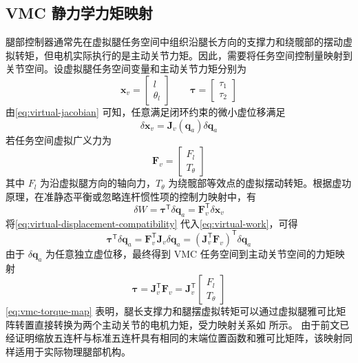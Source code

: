 \subsection{VMC 静力学力矩映射}

腿部控制器通常先在虚拟腿任务空间中组织沿腿长方向的支撑力和绕髋部的摆动虚拟转矩，但电机实际执行的是主动关节力矩。因此，需要将任务空间控制量映射到关节空间。设虚拟腿任务空间变量和主动关节力矩分别为
\begin{equation}
  \boldsymbol{x}_v =
  \begin{bmatrix}
    l \\
    \theta_l
  \end{bmatrix}
  \qquad
  \boldsymbol{\tau} =
  \begin{bmatrix}
    \tau_1 \\
    \tau_2
  \end{bmatrix}
  \label{eq:joint-torque-and-state}
\end{equation}
由\eqref{eq:virtual-jacobian} 可知，任意满足闭环约束的微小虚位移满足
\begin{equation}
  \delta\boldsymbol{x}_v
  =
  \boldsymbol{J}_v(\boldsymbol{q}_a)\delta\boldsymbol{q}_a
  \label{eq:virtual-displacement-compatibility}
\end{equation}
若任务空间虚拟广义力为
\begin{equation}
  \boldsymbol{F}_v =
  \begin{bmatrix}
    F_l \\
    T_\theta
  \end{bmatrix}
  \label{eq:virtual-force-vector}
\end{equation}
其中 $F_l$ 为沿虚拟腿方向的轴向力，$T_\theta$ 为绕髋部等效点的虚拟摆动转矩。根据虚功原理，在准静态平衡或忽略连杆惯性项的控制力映射中，有
\begin{equation}
  \delta W
  =
  \boldsymbol{\tau}^\mathsf{T}\delta\boldsymbol{q}_a
  =
  \boldsymbol{F}_v^\mathsf{T}\delta\boldsymbol{x}_v
  \label{eq:virtual-work}
\end{equation}
将\eqref{eq:virtual-displacement-compatibility} 代入\eqref{eq:virtual-work}，可得
\begin{equation}
  \boldsymbol{\tau}^\mathsf{T}\delta\boldsymbol{q}_a
  =
  \boldsymbol{F}_v^\mathsf{T}\boldsymbol{J}_v\delta\boldsymbol{q}_a
  =
  \left(
    \boldsymbol{J}_v^\mathsf{T}\boldsymbol{F}_v
  \right)^\mathsf{T}
  \delta\boldsymbol{q}_a
  \label{eq:virtual-work-substitution}
\end{equation}
由于 $\delta\boldsymbol{q}_a$ 为任意独立虚位移，最终得到 VMC 任务空间到主动关节空间的力矩映射
\begin{equation}
  \boldsymbol{\tau}
  =
  \boldsymbol{J}_v^\mathsf{T}\boldsymbol{F}_v
  =
  \boldsymbol{J}_v^\mathsf{T}
  \begin{bmatrix}
    F_l \\
    T_\theta
  \end{bmatrix}
  \label{eq:vmc-torque-map}
\end{equation}
\eqref{eq:vmc-torque-map} 表明，腿长支撑力和腿摆虚拟转矩可以通过虚拟腿雅可比矩阵转置直接转换为两个主动关节的电机力矩，受力映射关系如 所示。
由于前文已经证明缩放五连杆与标准五连杆具有相同的末端位置函数和雅可比矩阵，该映射同样适用于实际物理腿部机构。

